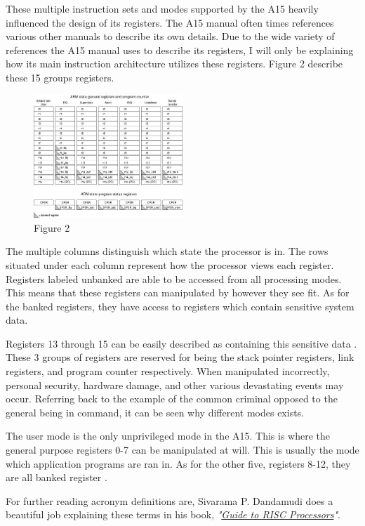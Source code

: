 \documentclass[12pt]{scrreprt}
\begin{document}
	These multiple instruction sets and modes supported by the A15 heavily influenced the design of its registers.
	The A15 manual often times references various other manuals to describe its own details.
	Due to the wide variety of references the A15 manual uses to describe its registers, I will only be explaining how its main instruction architecture utilizes these registers.
	Figure 2 describe these 15 groups registers.

	\begin{figure}[h]
		\centering
			\includegraphics[width=0.5\textwidth]{registers}
		\caption{Figure 2}
	\end{figure}

	The multiple columns distinguish which state the processor is in.
	The rows situated under each column represent how the processor views each register.
	Registers labeled unbanked are able to be accessed from all processing modes.
	This means that these registers can manipulated by however they see fit.
	As for the banked registers, they have access to registers which contain sensitive system data.

	Registers 13 through 15 can be easily described as containing this sensitive data \autocite[A2-45]{a7man}.
	These 3 groups of registers are reserved for being the stack pointer registers, link registers, and program counter respectively.
	When manipulated incorrectly, personal security, hardware damage, and other various devastating events may occur.
	Referring back to the example of the common criminal opposed to the general being in command, it can be seen why different modes exists.

	The user mode is the only unprivileged mode in the A15.
	This is where the general purpose registers 0-7 can be manipulated at will.
	This is usually the mode which application programs are ran in.
	As for the other five, registers 8-12, they are all banked register \autocite[123]{riscGuide}.

	For further reading acronym definitions are, Sivarama P. Dandamudi does a beautiful job explaining these terms in his book, \textit{"\underline{Guide to RISC Processors}"}.
\end{document}
